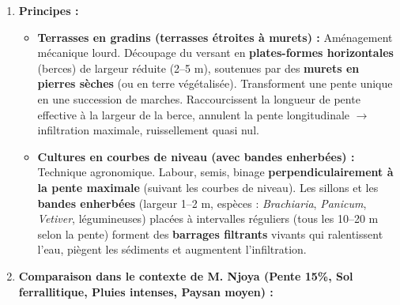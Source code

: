 \documentclass[11pt]{article}
\begin{document}
\begin{corrige}
\begin{enumerate}
    \item \textbf{Principes :}
    \begin{itemize}
        \item \textbf{Terrasses en gradins (terrasses étroites à murets) :} Aménagement mécanique lourd. Découpage du versant en \textbf{plates-formes horizontales} (berces) de largeur réduite (2--5 m), soutenues par des \textbf{murets en pierres sèches} (ou en terre végétalisée). Transforment une pente unique en une succession de marches. Raccourcissent la longueur de pente effective à la largeur de la berce, annulent la pente longitudinale $\rightarrow$ infiltration maximale, ruissellement quasi nul.
        \item \textbf{Cultures en courbes de niveau (avec bandes enherbées) :} Technique agronomique. Labour, semis, binage \textbf{perpendiculairement à la pente maximale} (suivant les courbes de niveau). Les sillons et les \textbf{bandes enherbées} (largeur 1--2 m, espèces : \textit{Brachiaria}, \textit{Panicum}, \textit{Vetiver}, légumineuses) placées à intervalles réguliers (tous les 10--20 m selon la pente) forment des \textbf{barrages filtrants} vivants qui ralentissent l'eau, piègent les sédiments et augmentent l'infiltration.
    \end{itemize}

    \item \textbf{Comparaison dans le contexte de M. Njoya (Pente 15\%, Sol ferrallitique, Pluies intenses, Paysan moyen) :}


\end{enumerate}
\end{corrige}
\end{document}

